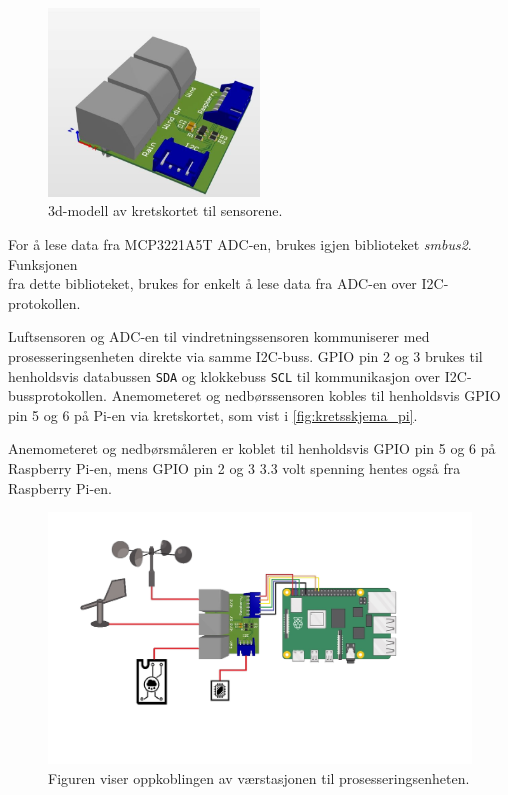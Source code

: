 \begin{figure}[H]
    \centering
    \includegraphics[width=0.5\textwidth]{implementering/sensorkretskort_3d.png}
    \caption{3d-modell av kretskortet til sensorene.}
    \label{fig:sensorkretskort_3d}
\end{figure}

For å lese data fra MCP3221A5T ADC-en, brukes igjen biblioteket \textit{smbus2}\cite{smbus2}. 
Funksjonen \\  fra dette biblioteket, brukes for enkelt å lese data fra ADC-en over I2C-protokollen. 


Luftsensoren og ADC-en til vindretningssensoren kommuniserer med prosesseringsenheten direkte via samme I2C-buss. 
GPIO pin 2 og 3 brukes til henholdsvis databussen \texttt{SDA} og klokkebuss \texttt{SCL} til kommunikasjon over I2C-bussprotokollen.
Anemometeret og nedbørssensoren kobles til henholdsvis GPIO pin 5 og 6 på Pi-en via kretskortet, som vist i \autoref{fig:kretsskjema_pi}. 

Anemometeret og nedbørsmåleren er koblet til henholdsvis GPIO pin 5 og 6 på Raspberry Pi-en, mens GPIO pin 2 og 3  3.3 volt spenning hentes også fra Raspberry Pi-en.

\begin{figure}[H]
    \centering
    \includegraphics[width=\textwidth]{implementering/kretsskjema_pi.png}
    \caption{Figuren viser oppkoblingen av værstasjonen til prosesseringsenheten.}
    \label{fig:kretsskjema_pi}
\end{figure}


